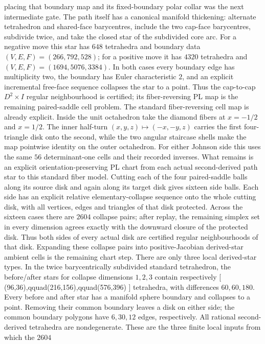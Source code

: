 placing that boundary map and its fixed-boundary polar collar was the next intermediate gate.
The path itself has a canonical manifold thickening: alternate tetrahedron and
shared-face barycentres, include the two cap-face barycentres, subdivide twice,
and take the closed star of the subdivided core arc.  For a negative move this
star has $648$ tetrahedra and boundary data $(V,E,F)=(266,792,528)$; for a
positive move it has $4320$ tetrahedra and
$(V,E,F)=(1694,5076,3384)$.  In both cases every boundary edge has multiplicity
two, the boundary has Euler characteristic $2$, and an explicit incremental
free-face sequence collapses the star to a point.  Thus the cap-to-cap
$D^2\times I$ regular neighbourhood is certified; its fiber-reversing PL map
is the remaining paired-saddle cell problem.
The standard fiber-reversing cell map is already explicit.  Inside the unit
octahedron take the diamond fibers at $x=-1/2$ and $x=1/2$.  The inner
half-turn $(x,y,z)\mapsto(-x,-y,z)$ carries the first four-triangle disk onto
the second, while the two angular staircase shells make the map pointwise
identity on the outer octahedron.  For either Johnson side this uses the same
$56$ determinant-one cells and their recorded inverses.  What remains is an
explicit orientation-preserving PL chart from each actual second-derived path
star to this standard fiber model.
Cutting each of the four paired-saddle balls along its source disk and again
along its target disk gives sixteen side balls.  Each side has an explicit
relative elementary-collapse sequence onto the whole cutting disk, with all
vertices, edges and triangles of that disk protected.  Across the sixteen
cases there are $2604$ collapse pairs; after replay, the remaining simplex set
in every dimension agrees exactly with the downward closure of the protected
disk.  Thus both sides of every actual disk are certified regular
neighbourhoods of that disk.  Expanding these collapse pairs into
positive-Jacobian derived-star ambient cells is the remaining chart step.
There are only three local derived-star types.  In the twice barycentrically
subdivided standard tetrahedron, the before/after stars for collapse dimensions
$1,2,3$ contain respectively
[
(96,36),qquad(216,156),qquad(576,396)
]
tetrahedra, with differences $60,60,180$.  Every before and after star has a
manifold sphere boundary and collapses to a point.  Removing their common
boundary leaves a disk on either side; the common boundary polygons have
$6,30,12$ edges, respectively.  All rational second-derived tetrahedra are
nondegenerate.  These are the three finite local inputs from which the $2604$
